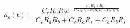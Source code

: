 \begin{equation}
a_{s}{\left(t \right)} = \frac{C_{c} R_{a} R_{b} e^{- \frac{t \left(R_{a} + R_{b}\right)}{C_{c} R_{a} R_{b} + C_{c} R_{a} R_{s} + C_{c} R_{b} R_{s}}}}{C_{c} R_{a} R_{b} + C_{c} R_{a} R_{s} + C_{c} R_{b} R_{s}}
\end{equation}

